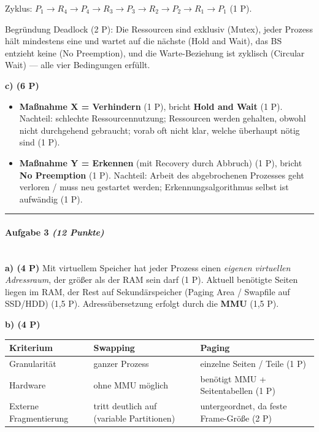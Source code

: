 \documentclass[11pt, a4paper]{article}
\begin{document}
Zyklus: $P_1 \to R_4 \to P_4 \to R_3 \to P_3 \to R_2 \to P_2 \to R_1 \to P_1$ (1 P).

Begründung Deadlock (2 P): Die Ressourcen sind exklusiv (Mutex), jeder Prozess hält mindestens eine und wartet auf die nächste (Hold and Wait), das BS entzieht keine (No Preemption), und die Warte-Beziehung ist zyklisch (Circular Wait) — alle vier Bedingungen erfüllt.


\textbf{c) (6 P)}

\begin{itemize}
  \item \textbf{Maßnahme X = Verhindern} (1 P), bricht \textbf{Hold and Wait} (1 P). Nachteil: schlechte Ressourcennutzung; Ressourcen werden gehalten, obwohl nicht durchgehend gebraucht; vorab oft nicht klar, welche überhaupt nötig sind (1 P).
  \item \textbf{Maßnahme Y = Erkennen} (mit Recovery durch Abbruch) (1 P), bricht \textbf{No Preemption} (1 P). Nachteil: Arbeit des abgebrochenen Prozesses geht verloren / muss neu gestartet werden; Erkennungsalgorithmus selbst ist aufwändig (1 P).
\end{itemize}


\noindent\textcolor{rulegray}{\rule{\linewidth}{0.4pt}}


\paragraph{Aufgabe 3 \textit{(12 Punkte)}}\mbox{}\\[2pt]

\textbf{a) (4 P)} Mit virtuellem Speicher hat jeder Prozess einen \textit{eigenen virtuellen Adressraum}, der größer als der RAM sein darf (1 P). Aktuell benötigte Seiten liegen im RAM, der Rest auf Sekundärspeicher (Paging Area / Swapfile auf SSD/HDD) (1,5 P). Adressübersetzung erfolgt durch die \textbf{MMU} (1,5 P).


\textbf{b) (4 P)}



{\small
\begin{tabularx}{\linewidth}{XXX}
\hline
\rowcolor{tableheadbg}
{\color{white}\textbf{Kriterium}} & {\color{white}\textbf{Swapping}} & {\color{white}\textbf{Paging}} \\[2pt]
\hline
\endhead
\hline
\endfoot
Granularität & ganzer Prozess & einzelne Seiten / Teile (1 P) \\
Hardware & ohne MMU möglich & benötigt MMU + Seitentabellen (1 P) \\
Externe Fragmentierung & tritt deutlich auf (variable Partitionen) & untergeordnet, da feste Frame-Größe (2 P) \\
\end{tabularx}
}
\end{document}
